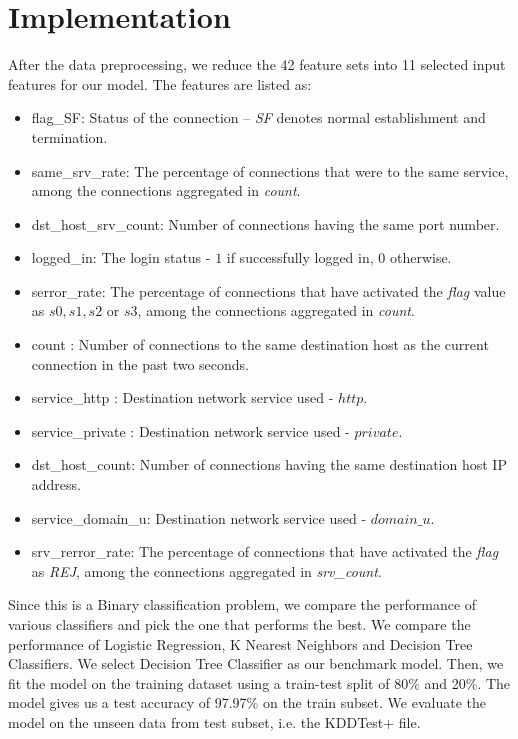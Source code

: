 \documentclass[conference]{IEEEtran}
\begin{document}
\section{Implementation}
After the data preprocessing, we reduce the 42 feature sets into 11 selected input features for our model. The features are listed as:
\begin{itemize}
\item flag\_SF: Status of the connection – \emph{SF} denotes normal establishment and termination.
\item same\_srv\_rate: The percentage of connections that were to the same service, among the connections aggregated in \emph{count}.
\item dst\_host\_srv\_count: Number of connections having the same port number.
\item logged\_in: The login status - $1$ if successfully logged in, $0$ otherwise.
\item serror\_rate: The percentage of connections that have activated the \emph{flag} value as $s0, s1, s2$ or $s3$, among the connections aggregated in \emph{count}.
\item count : Number of connections to the same destination host as the current connection in the past two seconds.
\item service\_http : Destination network service used - $http$.
\item service\_private : Destination network service used - $private$.
\item dst\_host\_count: Number of connections having the same destination host IP address.
\item service\_domain\_u: Destination network service used - $domain\_u$.
\item srv\_rerror\_rate: The percentage of connections that have activated the \emph{flag} as \emph{REJ}, among the connections aggregated in \emph{srv\_count}.
\end{itemize}


Since this is a Binary classification problem, we compare the performance of various classifiers and pick the one that performs the best. We compare the performance of Logistic Regression, K Nearest Neighbors and Decision Tree Classifiers. We select Decision Tree Classifier as our benchmark model. Then, we fit the model on the training dataset using a train-test split of 80\% and 20\%. The model gives us a test accuracy of 97.97\% on the train subset. We evaluate the model on the unseen data from test subset, i.e. the KDDTest+ file. 
\end{document}
